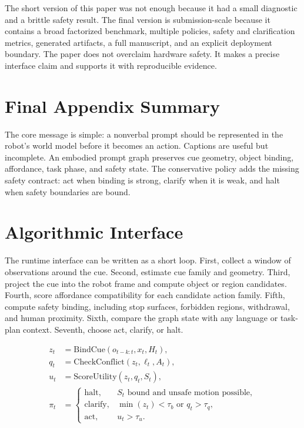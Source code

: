 \documentclass{article}
\begin{document}
The short version of this paper was not enough because it had a small diagnostic and a brittle safety result. The final version is submission-scale because it contains a broad factorized benchmark, multiple policies, safety and clarification metrics, generated artifacts, a full manuscript, and an explicit deployment boundary. The paper does not overclaim hardware safety. It makes a precise interface claim and supports it with reproducible evidence.

\section{Final Appendix Summary}

The core message is simple: a nonverbal prompt should be represented in the robot's world model before it becomes an action. Captions are useful but incomplete. An embodied prompt graph preserves cue geometry, object binding, affordance, task phase, and safety state. The conservative policy adds the missing safety contract: act when binding is strong, clarify when it is weak, and halt when safety boundaries are bound.

\section{Algorithmic Interface}

The runtime interface can be written as a short loop. First, collect a window of observations around the cue. Second, estimate cue family and geometry. Third, project the cue into the robot frame and compute object or region candidates. Fourth, score affordance compatibility for each candidate action family. Fifth, compute safety binding, including stop surfaces, forbidden regions, withdrawal, and human proximity. Sixth, compare the graph state with any language or task-plan context. Seventh, choose act, clarify, or halt.

\[
\begin{aligned}
z_t &= \mathrm{BindCue}(o_{t-k:t}, x_t, H_t),\\
q_t &= \mathrm{CheckConflict}(z_t, \ell_t, A_t),\\
u_t &= \mathrm{ScoreUtility}(z_t, q_t, S_t),\\
\pi_t &=
\begin{cases}
\mathrm{halt}, & S_t \text{ bound and unsafe motion possible},\\
\mathrm{clarify}, & \min(z_t) < \tau_b \text{ or } q_t > \tau_q,\\
\mathrm{act}, & u_t > \tau_u.
\end{cases}
\end{aligned}
\]
\end{document}
